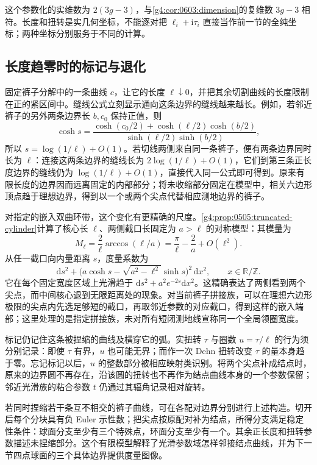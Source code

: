 这个参数化的实维数为 \(2(3g-3)\)，与\cref{g4:cor:0603:dimension}的复维数 \(3g-3\) 相符。长度和扭转是实几何坐标，不能逐对把 \(\ell_i+\mathrm{i}\tau_i\) 直接当作前一节的全纯坐标；两种坐标分别服务于不同的计算。

\subsection{长度趋零时的标记与退化}
\label{g4:subsec:0604:08}

固定裤子分解中的一条曲线 \(c\)，让它的长度 \(\ell\downarrow0\)，并把其余切割曲线的长度限制在正的紧区间中。缝线公式立刻显示通向这条边界的缝线越来越长。例如，若邻近裤子的另外两条边界长 \(b,c_0\) 保持正值，则
\[
	\cosh s
	=\frac{\cosh(c_0/2)+\cosh(\ell/2)\cosh(b/2)}
	{\sinh(\ell/2)\sinh(b/2)},
\]
所以 \(s=\log(1/\ell)+O(1)\)。若切线两侧来自同一条裤子，便有两条边界同时长为 \(\ell\)：连接这两条边界的缝线长为 \(2\log(1/\ell)+O(1)\)，它们到第三条正长度边界的缝线仍为 \(\log(1/\ell)+O(1)\)，直接代入同一公式即可得到。原来有限长度的边界因而远离固定的内部部分；将未收缩部分固定在模型中，相关六边形顶点趋于理想边界，得到以一个或两个尖点代替相应测地边界的裤子。

\ProseParagraphBreak

对指定的嵌入双曲环带，这个变化有更精确的尺度。\cref{g4:prop:0505:truncated-cylinder}计算了核心长 \(\ell\)、两侧截口长固定为 \(a>\ell\) 的对称模型：其模量为
\[
	M_\ell=\frac2\ell\arccos(\ell/a)
	=\frac\pi\ell-\frac2a+O(\ell^2).
\]
从任一截口向内量距离 \(s\)，度量系数为
\[
	\mathrm{d}s^2+
	\bigl(a\cosh s-\sqrt{a^2-\ell^2}\sinh s\bigr)^2\,\mathrm{d}x^2,
	\qquad x\in\mathbb R/\mathbb Z.
\]
它在每个固定宽度区域上光滑趋于 \(\mathrm{d}s^2+a^2e^{-2s}\mathrm{d}x^2\)。这精确表达了两侧看到两个尖点，而中间核心退到无限距离处的现象。对当前裤子拼接族，可以在理想六边形极限的尖点内先选足够短的截口，再取邻近参数的对应截口，得到这样的嵌入端部；这里处理的是指定拼接族，未对所有短闭测地线宣称同一个全局领圈宽度。

\ProseParagraphBreak

标记仍记住这条被捏缩的曲线及横穿它的弧。实扭转 \(\tau\) 与圈数 \(u=\tau/\ell\) 的行为须分别记录：即使 \(\tau\) 有界，\(u\) 也可能无界；而作一次 Dehn 扭转改变 \(\tau\) 的量本身趋于零。忘记标记以后，\(u\) 的整数部分被相应映射类识别。将两个尖点补成结点时，原来的边界圆不再存在，沿该圆的扭转也不再作为结点曲线本身的一个参数保留；邻近光滑族的粘合参数 \(t\) 仍通过其辐角记录相对旋转。

\ProseParagraphBreak

若同时捏缩若干条互不相交的裤子曲线，可在各配对边界分别进行上述构造。切开后每个分块具有负 Euler 示性数；把尖点按原配对补为结点，所得分支满足稳定性条件：球面分支至少有三个特殊点，环面分支至少有一个。其余正长度和扭转参数描述未捏缩部分。这个有限模型解释了光滑参数域怎样邻接结点曲线，并为下一节四点球面的三个具体边界提供度量图像。
